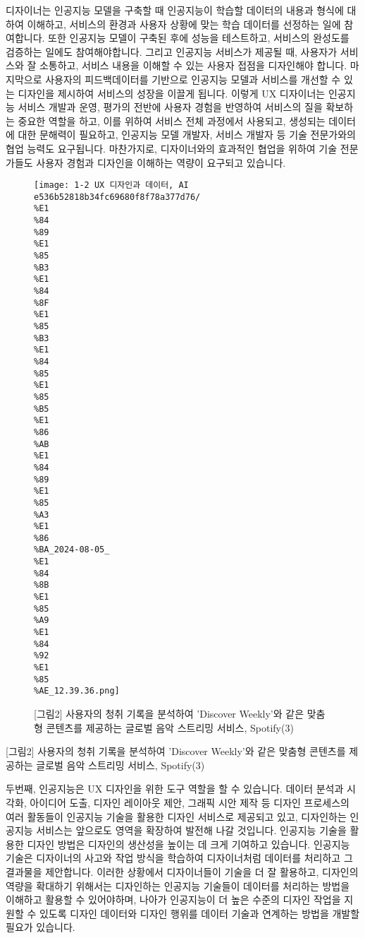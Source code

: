 \documentclass[
  letterpaper,
  DIV=11,
  numbers=noendperiod]{scrreprt}
\begin{document}
디자이너는 인공지능 모델을 구축할 때 인공지능이 학습할 데이터의 내용과
형식에 대하여 이해하고, 서비스의 환경과 사용자 상황에 맞는 학습 데이터를
선정하는 일에 참여합니다. 또한 인공지능 모델이 구축된 후에 성능을
테스트하고, 서비스의 완성도를 검증하는 일에도 참여해야합니다. 그리고
인공지능 서비스가 제공될 때, 사용자가 서비스와 잘 소통하고, 서비스
내용을 이해할 수 있는 사용자 접점을 디자인해야 합니다. 마지막으로
사용자의 피드백데이터를 기반으로 인공지능 모델과 서비스를 개선할 수 있는
디자인을 제시하여 서비스의 성장을 이끌게 됩니다. 이렇게 UX 디자이너는
인공지능 서비스 개발과 운영, 평가의 전반에 사용자 경험을 반영하여
서비스의 질을 확보하는 중요한 역할을 하고, 이를 위하여 서비스 전체
과정에서 사용되고, 생성되는 데이터에 대한 문해력이 필요하고, 인공지능
모델 개발자, 서비스 개발자 등 기술 전문가와의 협업 능력도 요구됩니다.
마찬가지로, 디자이너와의 효과적인 협업을 위하여 기술 전문가들도 사용자
경험과 디자인을 이해하는 역량이 요구되고 있습니다.

\begin{figure}[H]

{\centering \texttt{[image: 1-2 UX 디자인과 데이터, AI e536b52818b34fc69680f8f78a377d76/\\\%E1\\\%84\\\%89\\\%E1\\\%85\\\%B3\\\%E1\\\%84\\\%8F\\\%E1\\\%85\\\%B3\\\%E1\\\%84\\\%85\\\%E1\\\%85\\\%B5\\\%E1\\\%86\\\%AB\\\%E1\\\%84\\\%89\\\%E1\\\%85\\\%A3\\\%E1\\\%86\\\%BA\_2024-08-05\_\\\%E1\\\%84\\\%8B\\\%E1\\\%85\\\%A9\\\%E1\\\%84\\\%92\\\%E1\\\%85\\\%AE\_12.39.36.png]}

}

\caption{{[}그림2{]} 사용자의 청취 기록을 분석하여 'Discover Weekly'와
같은 맞춤형 콘텐츠를 제공하는 글로벌 음악 스트리밍 서비스, Spotify(3)}

\end{figure}%

{[}그림2{]} 사용자의 청취 기록을 분석하여 'Discover Weekly'와 같은
맞춤형 콘텐츠를 제공하는 글로벌 음악 스트리밍 서비스, Spotify(3)

두번째, 인공지능은 UX 디자인을 위한 도구 역할을 할 수 있습니다. 데이터
분석과 시각화, 아이디어 도출, 디자인 레이아웃 제안, 그래픽 시안 제작 등
디자인 프로세스의 여러 활동들이 인공지능 기술을 활용한 디자인 서비스로
제공되고 있고, 디자인하는 인공지능 서비스는 앞으로도 영역을 확장하여
발전해 나갈 것입니다. 인공지능 기술을 활용한 디자인 방법은 디자인의
생산성을 높이는 데 크게 기여하고 있습니다. 인공지능 기술은 디자이너의
사고와 작업 방식을 학습하여 디자이너처럼 데이터를 처리하고 그 결과물을
제안합니다. 이러한 상황에서 디자이너들이 기술을 더 잘 활용하고, 디자인의
역량을 확대하기 위해서는 디자인하는 인공지능 기술들이 데이터를 처리하는
방법을 이해하고 활용할 수 있어야하며, 나아가 인공지능이 더 높은 수준의
디자인 작업을 지원할 수 있도록 디자인 데이터와 디자인 행위를 데이터
기술과 연계하는 방법을 개발할 필요가 있습니다.
\end{document}
